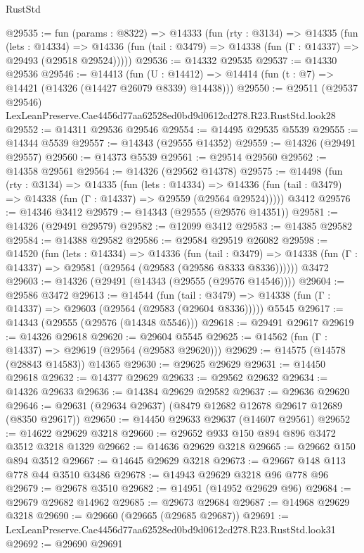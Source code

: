 \begin{lexlean}{RustStd}
\begin{coremodule}
@29535 := fun (params : @8322) =>
  @14333
    (fun (rty : @3134) =>
    @14335
      (fun (lets : @14334) =>
      @14336 (fun (tail : @3479) => @14338 (fun (Γ : @14337) => @29493 (@29518 @29524)))))
@29536 := @14332 @29535
@29537 := @14330 @29536
@29546 := @14413
    (fun (U : @14412) => @14414 (fun (t : @7) => @14421 (@14326 (@14427 @26079 @8339) @14438)))
@29550 := @29511
    (@29537 @29546)
    LexLeanPreserve.Cae4456d77aa62528ed0bd9d0612cd278.R23.RustStd.look28
@29552 := @14311 @29536 @29546
@29554 := @14495 @29535 @5539
@29555 := @14344 @5539
@29557 := @14343 (@29555 @14352)
@29559 := @14326 (@29491 @29557)
@29560 := @14373 @5539
@29561 := @29514 @29560
@29562 := @14358 @29561
@29564 := @14326 (@29562 @14378)
@29575 := @14498
    (fun (rty : @3134) =>
    @14335
      (fun (lets : @14334) =>
      @14336 (fun (tail : @3479) => @14338 (fun (Γ : @14337) => @29559 (@29564 @29524)))))
    @3412
@29576 := @14346 @3412
@29579 := @14343 (@29555 (@29576 @14351))
@29581 := @14326 (@29491 @29579)
@29582 := @12099 @3412
@29583 := @14385 @29582
@29584 := @14388 @29582
@29586 := @29584 @29519 @26082
@29598 := @14520
    (fun (lets : @14334) =>
    @14336
      (fun (tail : @3479) =>
      @14338 (fun (Γ : @14337) => @29581 (@29564 (@29583 (@29586 @8333 @8336))))))
    @3472
@29603 := @14326 (@29491 (@14343 (@29555 (@29576 @14546))))
@29604 := @29586 @3472
@29613 := @14544
    (fun (tail : @3479) => @14338 (fun (Γ : @14337) => @29603 (@29564 (@29583 (@29604 @8336)))))
    @5545
@29617 := @14343 (@29555 (@29576 (@14348 @5546)))
@29618 := @29491 @29617
@29619 := @14326 @29618
@29620 := @29604 @5545
@29625 := @14562 (fun (Γ : @14337) => @29619 (@29564 (@29583 @29620)))
@29629 := @14575 (@14578 (@28843 @14583)) @14365
@29630 := @29625 @29629
@29631 := @14450 @29618
@29632 := @14377 @29629
@29633 := @29562 @29632
@29634 := @14326 @29633
@29636 := @14384 @29629 @29582
@29637 := @29636 @29620
@29646 := @29631 (@29634 @29637) (@8479 @12682 @12678 @29617 @12689 (@8350 @29617))
@29650 := @14450 @29633 @29637 (@14607 @29561)
@29652 := @14622 @29629 @3218
@29660 := @29652 @933 @150 @894 @896 @3472 @3512 @3218 @1329
@29662 := @14636 @29629 @3218
@29665 := @29662 @150 @894 @3512
@29667 := @14645 @29629 @3218
@29673 := @29667 @148 @113 @778 @44 @3510 @3486
@29678 := @14943 @29629 @3218 @96 @778 @96
@29679 := @29678 @3510
@29682 := @14951 (@14952 @29629 @96)
@29684 := @29679 @29682 @14962
@29685 := @29673 @29684
@29687 := @14968 @29629 @3218
@29690 := @29660 (@29665 (@29685 @29687))
@29691 := LexLeanPreserve.Cae4456d77aa62528ed0bd9d0612cd278.R23.RustStd.look31
@29692 := @29690 @29691

\end{coremodule}
\end{lexlean}
